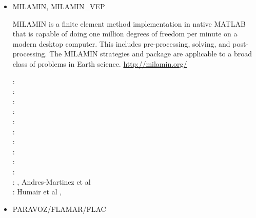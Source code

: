 \begin{itemize}
{\small
\noindent
\cite{nesg97}
\cite{nesb99}
}


\item {\codefont MILAMIN, MILAMIN\_VEP} 

MILAMIN is a finite element method implementation in native MATLAB that is capable of doing one million degrees of freedom per minute on a modern desktop computer. This includes pre-processing, solving, and post-processing. The MILAMIN strategies and package are applicable to a broad class of problems in Earth science. \url{http://milamin.org/}

\begin{scriptsize}
\twothousandeight: \cite{daks08}\cite{scdk08}\\
\twothousandnine: \cite{gogk09}\\
\twothousandten: \cite{krda10}\cite{kaus10}\cite{dekc10}\\
\twothousandeleven: \cite{yakm11}\\
\twothousandtwelve: \cite{gebk12}\cite{rukb12}\cite{thka12}\\
\twothousandthirteen: \cite{scpo13}\\
\twothousandfourteen: \cite{jobk14}\\
\twothousandfifteen: \cite{lukz15}\cite{gehm15}\cite{thkp15}\cite{musd15}\\
\twothousandsixteen: \cite{jads16}\cite{maka16}\cite{cakp16}\\
\twothousandeighteen: \cite{dusd18}\cite{jasc18}\cite{jadg18}\cite{comj18}\cite{jens18}\cite{rabw18}\cite{chsm18}\\
\twothousandnineteen: \cite{sifg19}\cite{baba19}\cite{sogh19}, Andres-Martinez et al \cite{anpa19}\\
\twothousandtwenty: Humair et al \cite{hube20},
\end{scriptsize}

\item PARAVOZ/FLAMAR/FLAC 


\end{itemize}

